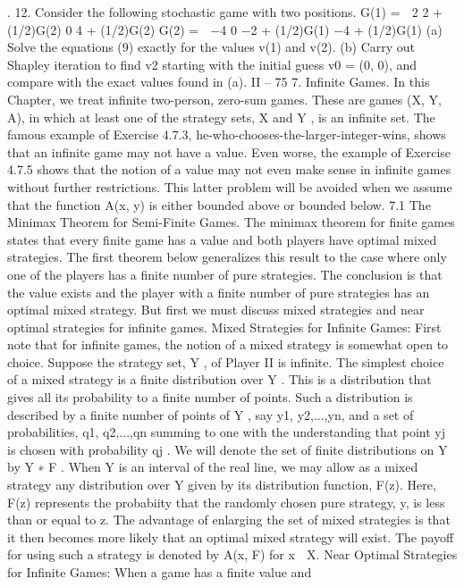 .
12. Consider the following stochastic game with two positions.
G(1) =
 2 2 + (1/2)G(2)
0 4 + (1/2)G(2)
G(2) =
 −4 0
−2 + (1/2)G(1) −4 + (1/2)G(1)
(a) Solve the equations (9) exactly for the values v(1) and v(2).
(b) Carry out Shapley iteration to find v2 starting with the initial guess v0 = (0, 0),
and compare with the exact values found in (a).
II – 75
7. Infinite Games.
In this Chapter, we treat infinite two-person, zero-sum games. These are games
(X, Y, A), in which at least one of the strategy sets, X and Y , is an infinite set. The
famous example of Exercise 4.7.3, he-who-chooses-the-larger-integer-wins, shows that an
infinite game may not have a value. Even worse, the example of Exercise 4.7.5 shows
that the notion of a value may not even make sense in infinite games without further
restrictions. This latter problem will be avoided when we assume that the function A(x, y)
is either bounded above or bounded below.
7.1 The Minimax Theorem for Semi-Finite Games. The minimax theorem for
finite games states that every finite game has a value and both players have optimal mixed
strategies. The first theorem below generalizes this result to the case where only one of
the players has a finite number of pure strategies. The conclusion is that the value exists
and the player with a finite number of pure strategies has an optimal mixed strategy. But
first we must discuss mixed strategies and near optimal strategies for infinite games.
Mixed Strategies for Infinite Games: First note that for infinite games, the notion
of a mixed strategy is somewhat open to choice. Suppose the strategy set, Y , of Player
II is infinite. The simplest choice of a mixed strategy is a finite distribution over Y .
This is a distribution that gives all its probability to a finite number of points. Such a
distribution is described by a finite number of points of Y , say y1, y2,...,yn, and a set of
probabilities, q1, q2,...,qn summing to one with the understanding that point yj is chosen
with probability qj . We will denote the set of finite distributions on Y by Y ∗
F .
When Y is an interval of the real line, we may allow as a mixed strategy any distribution
over Y given by its distribution function, F(z). Here, F(z) represents the probabiity
that the randomly chosen pure strategy, y, is less than or equal to z. The advantage of
enlarging the set of mixed strategies is that it then becomes more likely that an optimal
mixed strategy will exist. The payoff for using such a strategy is denoted by A(x, F) for
x ∈ X.
Near Optimal Strategies for Infinite Games: When a game has a finite value and
